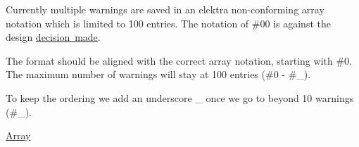 Currently multiple warnings are saved in an elektra non-\/conforming array notation which is limited to 100 entries. The notation of {\ttfamily \#00} is against the design \mbox{\hyperlink{doc_decisions_array_md}{decision made}}.

The format should be aligned with the correct array notation, starting with {\ttfamily \#0}. The maximum number of warnings will stay at 100 entries ({\ttfamily \#0} -\/ {\ttfamily \#\+\_}).

To keep the ordering we add an underscore {\ttfamily \+\_\+} once we go to beyond 10 warnings ({\ttfamily \#\+\_}).


\begin{DoxyItemize}
\item \mbox{\hyperlink{doc_decisions_array_md}{Array}}
\end{DoxyItemize}